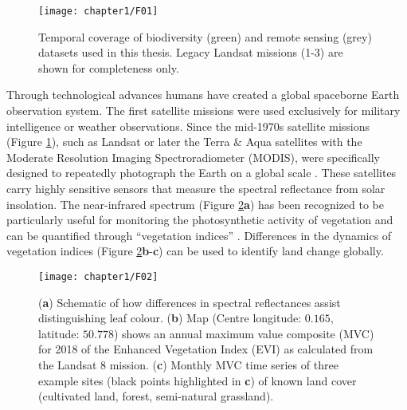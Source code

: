 \begin{figure}[htb]
\centering
\texttt{[image: chapter1/F01]}
\caption{ Temporal coverage of biodiversity (green) and remote sensing (grey) datasets used in this thesis. Legacy Landsat missions (1-3) are shown for completeness only. }
\label{F01_01}
\end{figure}

Through technological advances humans have created a global spaceborne Earth observation system. The first satellite missions were used exclusively for military intelligence or weather observations. Since the mid-1970s satellite missions (Figure \ref{F01_01}), such as Landsat or later the Terra \& Aqua satellites with the Moderate Resolution Imaging Spectroradiometer (MODIS), were specifically designed to repeatedly photograph the Earth on a global scale \citep{Schaaf2002,Zhang2006,Kennedy2014}. These satellites carry highly sensitive sensors that measure the spectral reflectance from solar insolation. The near-infrared spectrum (Figure \ref{F01_02}\textbf{a}) has been recognized to be particularly useful for monitoring the photosynthetic activity of vegetation and can be quantified through “vegetation indices” \citep{Tucker1979,Tucker1981,Pettorelli2005,Jiang2008}. Differences in the dynamics of vegetation indices (Figure \ref{F01_02}\textbf{b}-\textbf{c}) can be used to identify land change globally. 

\begin{figure}[htb]
\centering
\texttt{[image: chapter1/F02]}
\caption{ (\textbf{a}) Schematic of how differences in spectral reflectances assist distinguishing leaf colour. (\textbf{b}) Map (Centre longitude: $0.165$\textdegree, latitude: $50.778$\textdegree) shows an annual maximum value composite (MVC) for 2018 of the Enhanced Vegetation Index (EVI) as calculated from the Landsat 8 mission. (\textbf{c}) Monthly MVC time series of three example sites (black points highlighted in \textbf{c}) of known land cover (cultivated land, forest, semi-natural grassland). }
\label{F01_02}
\end{figure}

